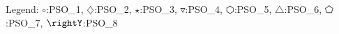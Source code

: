 Legend: {\color{NavyBlue}$\circ$}:PSO\_1, {\color{Magenta}$\diamondsuit$}:PSO\_2, {\color{Orange}$\star$}:PSO\_3, {\color{CornflowerBlue}$\triangledown$}:PSO\_4, {\color{red}$\varhexagon$}:PSO\_5, {\color{YellowGreen}$\triangle$}:PSO\_6, {\color{cyan}$\pentagon$}:PSO\_7, {\color{GreenYellow}$\rightY$}:PSO\_8